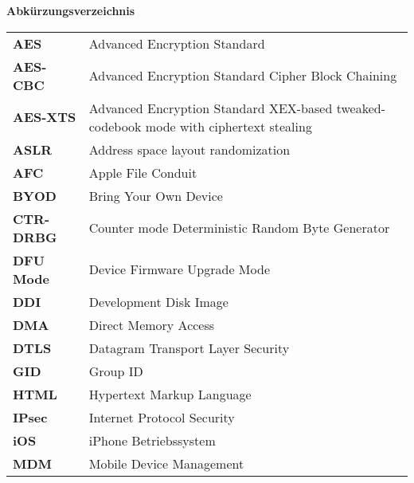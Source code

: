 %
%
% 
% 
% 

\begin{center}
{\Large\bfseries Abkürzungsverzeichnis}
\end{center}

\begin{table*}[htbp]
		 \begin{tabular}{p{3cm}p{12cm}} 
		    \textbf{AES} & Advanced Encryption Standard \\
            \textbf{AES-CBC} & Advanced Encryption Standard Cipher Block Chaining \\
            \textbf{AES-XTS} & Advanced Encryption Standard XEX-based tweaked-codebook mode with ciphertext stealing \\ 
		     \textbf{ASLR} & Address space layout randomization \\
		     \textbf{AFC} & Apple File Conduit\\
		     
		     \textbf{BYOD} & Bring Your Own Device\\
		     
		     \textbf{CTR-DRBG} & Counter mode Deterministic Random Byte Generator \\
		     
		     \textbf{DFU Mode} & Device Firmware Upgrade Mode\\
		     \textbf{DDI} & Development Disk Image \\
		     \textbf{DMA} & Direct Memory Access\\
		     \textbf{DTLS} & Datagram Transport Layer Security \\
		     
		     \textbf{GID} & Group ID \\
		     
		     \textbf{HTML} & Hypertext Markup Language \\
		     
		     \textbf{IPsec} & Internet Protocol Security \\
		     \textbf{iOS} & iPhone Betriebssystem\\
		     
		     
		     \textbf{MDM} & Mobile Device Management \\
		     

\end{tabular}
\end{table*}
